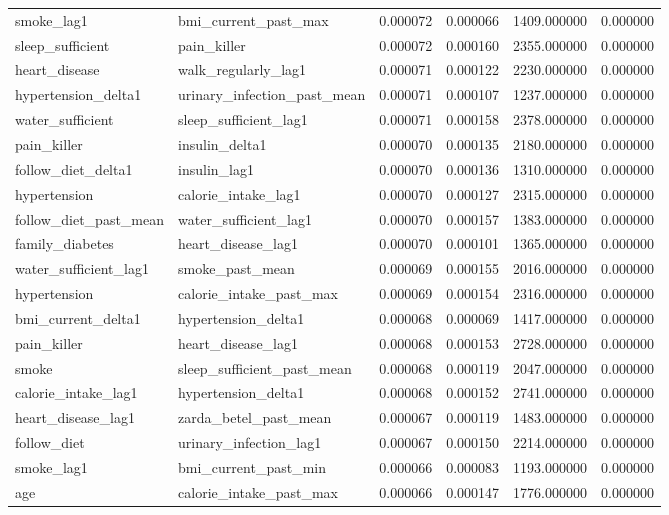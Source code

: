 \begin{longtable}{llrrrr}
smoke\_lag1 & bmi\_current\_past\_max & 0.000072 & 0.000066 & 1409.000000 & 0.000000 \\
sleep\_sufficient & pain\_killer & 0.000072 & 0.000160 & 2355.000000 & 0.000000 \\
heart\_disease & walk\_regularly\_lag1 & 0.000071 & 0.000122 & 2230.000000 & 0.000000 \\
hypertension\_delta1 & urinary\_infection\_past\_mean & 0.000071 & 0.000107 & 1237.000000 & 0.000000 \\
water\_sufficient & sleep\_sufficient\_lag1 & 0.000071 & 0.000158 & 2378.000000 & 0.000000 \\
pain\_killer & insulin\_delta1 & 0.000070 & 0.000135 & 2180.000000 & 0.000000 \\
follow\_diet\_delta1 & insulin\_lag1 & 0.000070 & 0.000136 & 1310.000000 & 0.000000 \\
hypertension & calorie\_intake\_lag1 & 0.000070 & 0.000127 & 2315.000000 & 0.000000 \\
follow\_diet\_past\_mean & water\_sufficient\_lag1 & 0.000070 & 0.000157 & 1383.000000 & 0.000000 \\
family\_diabetes & heart\_disease\_lag1 & 0.000070 & 0.000101 & 1365.000000 & 0.000000 \\
water\_sufficient\_lag1 & smoke\_past\_mean & 0.000069 & 0.000155 & 2016.000000 & 0.000000 \\
hypertension & calorie\_intake\_past\_max & 0.000069 & 0.000154 & 2316.000000 & 0.000000 \\
bmi\_current\_delta1 & hypertension\_delta1 & 0.000068 & 0.000069 & 1417.000000 & 0.000000 \\
pain\_killer & heart\_disease\_lag1 & 0.000068 & 0.000153 & 2728.000000 & 0.000000 \\
smoke & sleep\_sufficient\_past\_mean & 0.000068 & 0.000119 & 2047.000000 & 0.000000 \\
calorie\_intake\_lag1 & hypertension\_delta1 & 0.000068 & 0.000152 & 2741.000000 & 0.000000 \\
heart\_disease\_lag1 & zarda\_betel\_past\_mean & 0.000067 & 0.000119 & 1483.000000 & 0.000000 \\
follow\_diet & urinary\_infection\_lag1 & 0.000067 & 0.000150 & 2214.000000 & 0.000000 \\
smoke\_lag1 & bmi\_current\_past\_min & 0.000066 & 0.000083 & 1193.000000 & 0.000000 \\
age & calorie\_intake\_past\_max & 0.000066 & 0.000147 & 1776.000000 & 0.000000 \\

\end{longtable}
